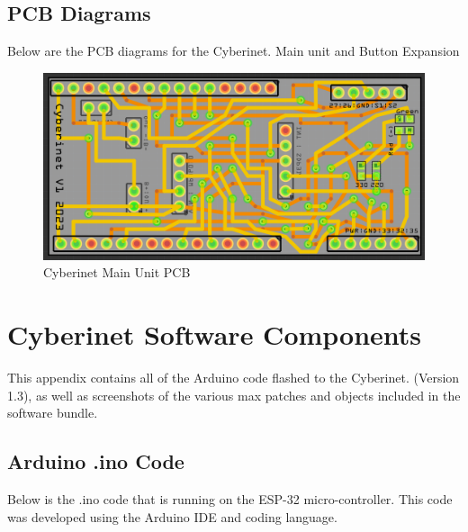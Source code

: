 \section{PCB Diagrams}
Below are the PCB diagrams for the Cyberinet. Main unit and Button Expansion


\begin{center}
\begin{figure}
    \centering
    \includegraphics[scale=0.3]{diagrams/PCBs/mainBoard.png}
    \caption{Cyberinet Main Unit PCB}
    \label{fig:mainPCB}
\end{figure}
\end{center}



\chapter{Cyberinet Software Components}
This appendix contains all of the Arduino code flashed to the Cyberinet. (Version 1.3), as well as screenshots of the various max patches and objects included in the software bundle.

\section{Arduino .ino Code}

Below is the .ino code that is running on the ESP-32 micro-controller. This code was developed using the Arduino IDE and coding language.

